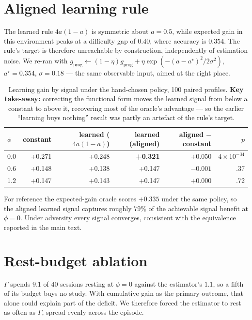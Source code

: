 \documentclass{article}
\begin{document}
\section{Aligned learning rule}
\label{app:aligned}

The learned rule $4a(1-a)$ is symmetric about $a{=}0.5$, while expected gain in this environment peaks at a difficulty gap of $0.40$, where accuracy is $0.354$. The rule's target is therefore unreachable by construction, independently of estimation noise. We re-ran with $g_{\text{prog}} \leftarrow (1-\eta)g_{\text{prog}} + \eta\exp(-(a-a^\star)^2/2\sigma^2)$, $a^\star{=}0.354$, $\sigma{=}0.18$ --- the same observable input, aimed at the right place.

\begin{table}[H]
  \caption{Learning gain by signal under the hand-chosen policy, 100 paired profiles. \textbf{Key take-away:} correcting the functional form moves the learned signal from below a constant to above it, recovering most of the oracle's advantage --- so the earlier ``learning buys nothing'' result was partly an artefact of the rule's target.}
  \centering\small
  \begin{tabular}{lrrrrr}
    \toprule
    $\phi$ & constant & learned ($4a(1{-}a)$) & learned (aligned) & aligned $-$ constant & $p$ \\
    \midrule
    0.0 & +0.271 & +0.248 & \textbf{+0.321} & $+0.050$ & $4\times10^{-34}$ \\
    0.6 & +0.148 & +0.138 & +0.147 & $-0.001$ & $.37$ \\
    1.2 & +0.147 & +0.143 & +0.147 & $+0.000$ & $.72$ \\
    \bottomrule
  \end{tabular}
\end{table}

For reference the expected-gain oracle scores $+0.335$ under the same policy, so the aligned learned signal captures roughly $79\%$ of the achievable signal benefit at $\phi{=}0$. Under adversity every signal converges, consistent with the equivalence reported in the main text.

\section{Rest-budget ablation}
\label{app:restmatch}

$\Gamma$ spends $9.1$ of 40 sessions resting at $\phi{=}0$ against the estimator's $1.1$, so a fifth of its budget buys no study. With cumulative gain as the primary outcome, that alone could explain part of the deficit. We therefore forced the estimator to rest as often as $\Gamma$, spread evenly across the episode.
\end{document}
